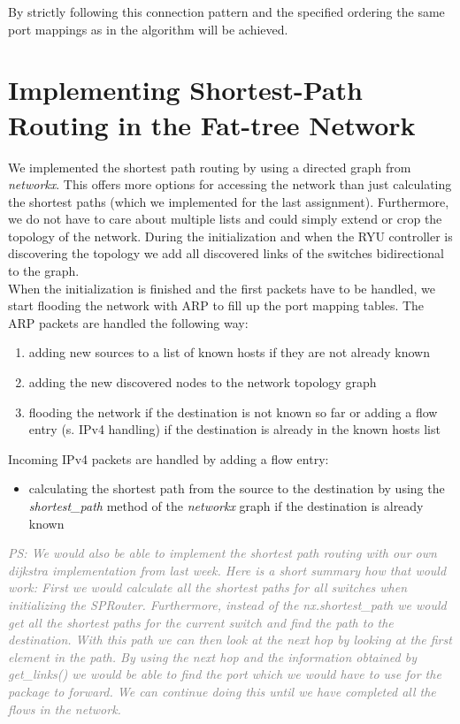 \documentclass[a4paper,11pt]{article}
\newcommand{\note}[1]{\textit{\textcolor{gray}{#1}}}
\begin{document}
By strictly following this connection pattern and the specified ordering the same port mappings as in the algorithm will be achieved.


\section{Implementing Shortest-Path Routing in the Fat-tree Network}


We implemented the shortest path routing by using a directed graph from \textit{networkx}.
This offers more options for accessing the network than just calculating the shortest paths (which we implemented for the last assignment).
Furthermore, we do not have to care about multiple lists and could simply extend or crop the topology of the network.
During the initialization and when the RYU controller is discovering the topology we add all discovered links of the switches bidirectional to the graph.\\
When the initialization is finished and the first packets have to be handled, we start flooding the network with ARP to fill up the port mapping tables.
The ARP packets are handled the following way:
\begin{enumerate}
    \item adding new sources to a list of known hosts if they are not already known
    \item adding the new discovered nodes to the network topology graph
    \item flooding the network if the destination is not known so far or adding a flow entry (s. IPv4 handling) if the destination is already in the known hosts list
\end{enumerate}
Incoming IPv4 packets are handled by adding a flow entry:
\begin{itemize}
    \item calculating the shortest path from the source to the destination by using the \textit{shortest\_path} method of the \textit{networkx} graph if the destination is already known
\end{itemize}

\note{PS: We would also be able to implement the shortest path routing with our own dijkstra implementation from last week. Here is a short summary how that would work: First we would calculate all the shortest paths for all switches when initializing the SPRouter. Furthermore, instead of the nx.shortest\_path we would get all the shortest paths for the current switch and find the path to the destination. With this path we can then look at the next hop by looking at the first element in the path. By using the next hop and the information obtained by get\_links() we would be able to find the port which we would have to use for the package to forward. We can continue doing this until we have completed all the flows in the network.}
\end{document}
